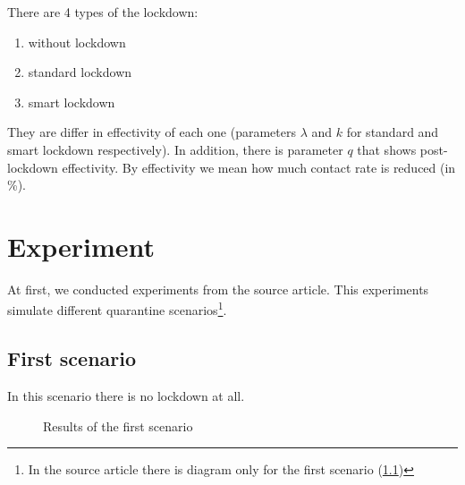 \documentclass[12pt,a4paper,english]{article}
\begin{document}
    There are 4 types of the lockdown:
    \begin{enumerate}
        \item without lockdown
        \item standard lockdown
        \item smart lockdown
    \end{enumerate}
    \noindent They are differ in effectivity of each one (parameters $\lambda$ and $k$ for standard and smart lockdown respectively). 
    In addition, there is parameter $q$ that shows post-lockdown effectivity.
    By effectivity we mean how much contact rate is reduced (in \%).

    \section{Experiment}
    At first, we conducted experiments from the source article.
    This experiments simulate different quarantine scenarios\footnote{In the source article there is diagram only for the first scenario (\ref{first_scen})}.

    \subsection{First scenario}
    \label{first_scen}
    In this scenario there is no lockdown at all.
    \begin{figure}[h!]
        \centering
        \hfill
        \caption{Results of the first scenario}
    \end{figure}
\end{document}
